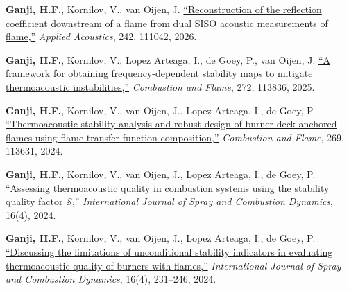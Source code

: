 \documentclass[a4paper,11pt]{article}
\begin{document}
\begin{enumerate}[
    leftmargin=*,
    labelsep=0.5em,
    align=left,
    widest={[\textbf{J.10}]},
    itemindent=0em
]

\item[\textbf{[J.1]}]
\textbf{Ganji, H.F.}, Kornilov, V., van Oijen, J.
\href{https://www.sciencedirect.com/science/article/pii/S0003682X25005146}
{``Reconstruction of the reflection coefficient downstream of a flame from dual SISO acoustic measurements of flame,''}
\textit{Applied Acoustics}, 242, 111042, 2026.

\item[\textbf{[J.2]}]
\textbf{Ganji, H.F.}, Kornilov, V., Lopez Arteaga, I., de Goey, P., van Oijen, J.
\href{https://www.sciencedirect.com/science/article/pii/S0010218024005455}
{``A framework for obtaining frequency-dependent stability maps to mitigate thermoacoustic instabilities,''}
\textit{Combustion and Flame}, 272, 113836, 2025.

\item[\textbf{[J.3]}]
\textbf{Ganji, H.F.}, Kornilov, V., van Oijen, J., Lopez Arteaga, I., de Goey, P.
\href{https://www.sciencedirect.com/science/article/pii/S0010218024003407}
{``Thermoacoustic stability analysis and robust design of burner-deck-anchored flames using flame transfer function composition,''}
\textit{Combustion and Flame}, 269, 113631, 2024.

\item[\textbf{[J.4]}]
\textbf{Ganji, H.F.}, Kornilov, V., van Oijen, J., Lopez Arteaga, I., de Goey, P.
\href{https://journals.sagepub.com/doi/10.1177/17568277241288372}
{``Assessing thermoacoustic quality in combustion systems using the stability quality factor $\mathcal{S}$,''}
\textit{International Journal of Spray and Combustion Dynamics}, 16(4), 2024.

\item[\textbf{[J.5]}]
\textbf{Ganji, H.F.}, Kornilov, V., van Oijen, J., Lopez Arteaga, I., de Goey, P.
\href{https://journals.sagepub.com/doi/10.1177/17568277241265433}
{``Discussing the limitations of unconditional stability indicators in evaluating thermoacoustic quality of burners with flames,''}
\textit{International Journal of Spray and Combustion Dynamics}, 16(4), 231--246, 2024.


\end{enumerate}
\end{document}

